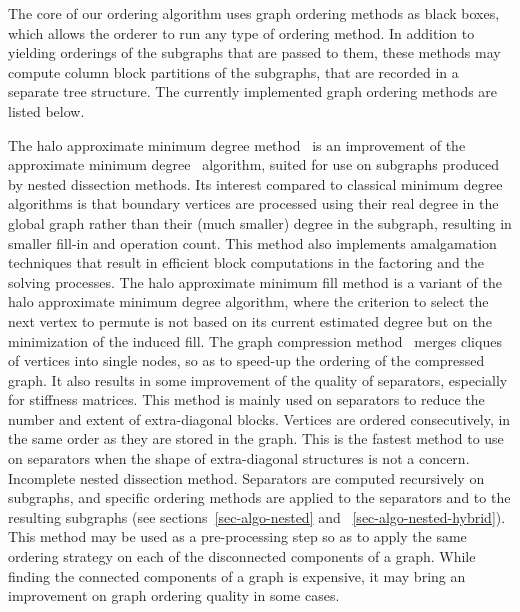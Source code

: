 The core of our ordering algorithm uses graph ordering methods as
black boxes, which allows the orderer to run any type of ordering
method. In addition to yielding orderings of the subgraphs that are
passed to them, these methods may compute column block partitions of
the subgraphs, that are recorded in a separate tree structure.
The currently implemented graph ordering methods are listed below.
\begin{itemize}
The halo approximate minimum degree method~\cite{peroam99} is an
improvement of the approximate minimum degree~\cite{amdadu96}
algorithm, suited for use on subgraphs produced by nested dissection
methods. Its interest compared to classical minimum degree algorithms
is that boundary vertices are processed using their real degree in the
global graph rather than their (much smaller) degree in the subgraph,
resulting in smaller fill-in and operation count. This method also
implements amalgamation techniques that result in efficient block
computations in the factoring and the solving processes.
The halo approximate minimum fill method is a variant of the
halo approximate minimum degree algorithm, where the criterion to
select the next vertex to permute is not based on its current
estimated degree but on the minimization of the induced fill.
The graph compression method~\cite{ashc95} merges cliques of vertices
into single nodes, so as to speed-up the ordering of the compressed
graph. It also results in some improvement of the quality of
separators, especially for stiffness matrices.
This method is mainly used on separators to reduce the number and
extent of extra-diagonal blocks.
Vertices are ordered consecutively, in the same order as they are
stored in the graph. This is the fastest method to use on separators
when the shape of extra-diagonal structures is not a concern.
Incomplete nested dissection method. Separators are computed
recursively on subgraphs, and specific ordering methods are applied to
the separators and to the resulting subgraphs (see
sections~\ref{sec-algo-nested} and ~\ref{sec-algo-nested-hybrid}).
This method may be used as a pre-processing step so as to apply the same
ordering strategy on each of the disconnected components of a
graph. While finding the connected components of a graph is expensive,
it may bring an improvement on graph ordering quality in some cases.
\end{itemize}

